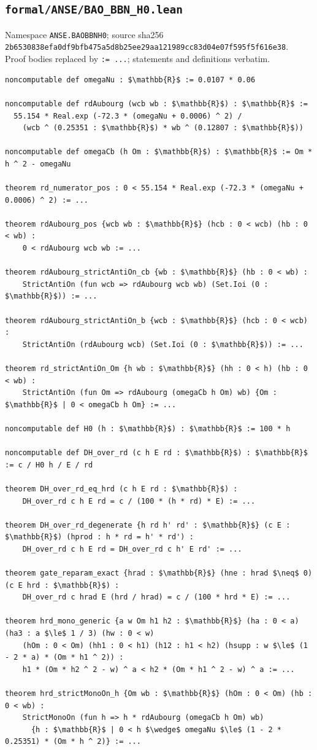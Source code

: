 \subsection*{\texttt{formal/ANSE/BAO\_BBN\_H0.lean}}
Namespace \texttt{ANSE.BAOBBNH0}; source sha256\\ {\scriptsize\texttt{2b6530838efa0df9bfb475a5d8b25ee29aa121989cc83d04e07f595f5f616e38}}.\\ Proof bodies replaced by \texttt{:= ...}; statements and definitions verbatim.
\begin{lstlisting}[mathescape]
noncomputable def omegaNu : $\mathbb{R}$ := 0.0107 * 0.06

noncomputable def rdAubourg (wcb wb : $\mathbb{R}$) : $\mathbb{R}$ :=
  55.154 * Real.exp (-72.3 * (omegaNu + 0.0006) ^ 2) /
    (wcb ^ (0.25351 : $\mathbb{R}$) * wb ^ (0.12807 : $\mathbb{R}$))

noncomputable def omegaCb (h Om : $\mathbb{R}$) : $\mathbb{R}$ := Om * h ^ 2 - omegaNu

theorem rd_numerator_pos : 0 < 55.154 * Real.exp (-72.3 * (omegaNu + 0.0006) ^ 2) := ...

theorem rdAubourg_pos {wcb wb : $\mathbb{R}$} (hcb : 0 < wcb) (hb : 0 < wb) :
    0 < rdAubourg wcb wb := ...

theorem rdAubourg_strictAntiOn_cb {wb : $\mathbb{R}$} (hb : 0 < wb) :
    StrictAntiOn (fun wcb => rdAubourg wcb wb) (Set.Ioi (0 : $\mathbb{R}$)) := ...

theorem rdAubourg_strictAntiOn_b {wcb : $\mathbb{R}$} (hcb : 0 < wcb) :
    StrictAntiOn (rdAubourg wcb) (Set.Ioi (0 : $\mathbb{R}$)) := ...

theorem rd_strictAntiOn_Om {h wb : $\mathbb{R}$} (hh : 0 < h) (hb : 0 < wb) :
    StrictAntiOn (fun Om => rdAubourg (omegaCb h Om) wb) {Om : $\mathbb{R}$ | 0 < omegaCb h Om} := ...

noncomputable def H0 (h : $\mathbb{R}$) : $\mathbb{R}$ := 100 * h

noncomputable def DH_over_rd (c h E rd : $\mathbb{R}$) : $\mathbb{R}$ := c / H0 h / E / rd

theorem DH_over_rd_eq_hrd (c h E rd : $\mathbb{R}$) :
    DH_over_rd c h E rd = c / (100 * (h * rd) * E) := ...

theorem DH_over_rd_degenerate {h rd h' rd' : $\mathbb{R}$} (c E : $\mathbb{R}$) (hprod : h * rd = h' * rd') :
    DH_over_rd c h E rd = DH_over_rd c h' E rd' := ...

theorem gate_reparam_exact {hrad : $\mathbb{R}$} (hne : hrad $\neq$ 0) (c E hrd : $\mathbb{R}$) :
    DH_over_rd c hrad E (hrd / hrad) = c / (100 * hrd * E) := ...

theorem hrd_mono_generic {a w Om h1 h2 : $\mathbb{R}$} (ha : 0 < a) (ha3 : a $\le$ 1 / 3) (hw : 0 < w)
    (hOm : 0 < Om) (hh1 : 0 < h1) (h12 : h1 < h2) (hsupp : w $\le$ (1 - 2 * a) * (Om * h1 ^ 2)) :
    h1 * (Om * h2 ^ 2 - w) ^ a < h2 * (Om * h1 ^ 2 - w) ^ a := ...

theorem hrd_strictMonoOn_h {Om wb : $\mathbb{R}$} (hOm : 0 < Om) (hb : 0 < wb) :
    StrictMonoOn (fun h => h * rdAubourg (omegaCb h Om) wb)
      {h : $\mathbb{R}$ | 0 < h $\wedge$ omegaNu $\le$ (1 - 2 * 0.25351) * (Om * h ^ 2)} := ...
\end{lstlisting}

